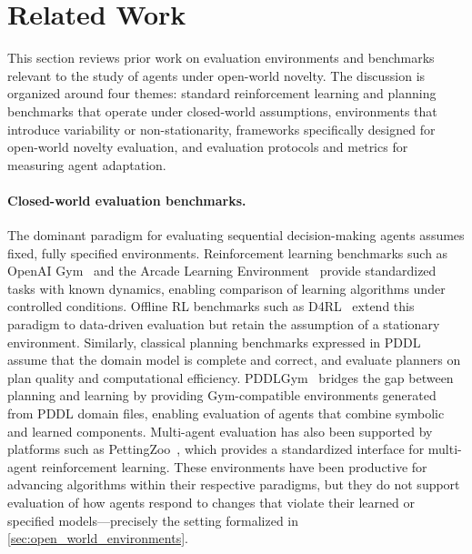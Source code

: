 \section{Related Work}
\label{sec:benchmarks_related_work}

This section reviews prior work on evaluation environments and benchmarks relevant to the study of agents under open-world novelty. The discussion is organized around four themes: standard reinforcement learning and planning benchmarks that operate under closed-world assumptions, environments that introduce variability or non-stationarity, frameworks specifically designed for open-world novelty evaluation, and evaluation protocols and metrics for measuring agent adaptation.

\paragraph{Closed-world evaluation benchmarks.}
The dominant paradigm for evaluating sequential decision-making agents assumes fixed, fully specified environments. Reinforcement learning benchmarks such as OpenAI Gym~\citep{brockman2016openai} and the Arcade Learning Environment~\citep{bellemare2013arcade} provide standardized tasks with known dynamics, enabling comparison of learning algorithms under controlled conditions. Offline RL benchmarks such as D4RL~\citep{fu2020d4rl} extend this paradigm to data-driven evaluation but retain the assumption of a stationary environment. Similarly, classical planning benchmarks expressed in PDDL~\citep{mcdermott1998pddl} assume that the domain model is complete and correct, and evaluate planners on plan quality and computational efficiency. PDDLGym~\citep{silver2020pddlgym} bridges the gap between planning and learning by providing Gym-compatible environments generated from PDDL domain files, enabling evaluation of agents that combine symbolic and learned components. Multi-agent evaluation has also been supported by platforms such as PettingZoo~\citep{terry2021pettingzoo}, which provides a standardized interface for multi-agent reinforcement learning. These environments have been productive for advancing algorithms within their respective paradigms, but they do not support evaluation of how agents respond to changes that violate their learned or specified models---precisely the setting formalized in \cref{sec:open_world_environments}.

